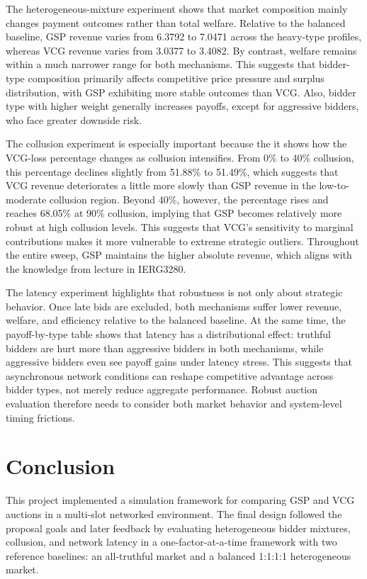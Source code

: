 \documentclass[12pt,a4paper]{article}
\begin{document}
The heterogeneous-mixture experiment shows that market composition mainly changes payment outcomes rather than total welfare. Relative to the balanced baseline, GSP revenue varies from 6.3792 to 7.0471 across the heavy-type profiles, whereas VCG revenue varies from 3.0377 to 3.4082. By contrast, welfare remains within a much narrower range for both mechanisms. This suggests that bidder-type composition primarily affects competitive price pressure and surplus distribution, with GSP exhibiting more stable outcomes than VCG. Also, bidder type with higher weight generally increases payoffs, except for aggressive bidders, who face greater downside risk.

The collusion experiment is especially important because the it shows how the VCG-loss percentage changes as collusion intensifies. From 0\% to 40\% collusion, this percentage declines slightly from 51.88\% to 51.49\%, which suggests that VCG revenue deteriorates a little more slowly than GSP revenue in the low-to-moderate collusion region. Beyond 40\%, however, the percentage rises and reaches 68.05\% at 90\% collusion, implying that GSP becomes relatively more robust at high collusion levels. This suggests that VCG’s sensitivity to marginal contributions makes it more vulnerable to extreme strategic outliers. Throughout the entire sweep, GSP maintains the higher absolute revenue, which aligns with the knowledge from lecture in IERG3280.

The latency experiment highlights that robustness is not only about strategic behavior. Once late bids are excluded, both mechanisms suffer lower revenue, welfare, and efficiency relative to the balanced baseline. At the same time, the payoff-by-type table shows that latency has a distributional effect: truthful bidders are hurt more than aggressive bidders in both mechanisms, while aggressive bidders even see payoff gains under latency stress. This suggests that asynchronous network conditions can reshape competitive advantage across bidder types, not merely reduce aggregate performance. Robust auction evaluation therefore needs to consider both market behavior and system-level timing frictions.

\section{Conclusion}

This project implemented a simulation framework for comparing GSP and VCG auctions in a multi-slot networked environment. The final design followed the proposal goals and later feedback by evaluating heterogeneous bidder mixtures, collusion, and network latency in a one-factor-at-a-time framework with two reference baselines: an all-truthful market and a balanced 1:1:1:1 heterogeneous market.
\end{document}
